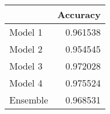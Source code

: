 \begin{tabular}{lr}
\toprule
{} &  Accuracy \\
\midrule
Model 1  &  0.961538 \\
Model 2  &  0.954545 \\
Model 3  &  0.972028 \\
Model 4  &  0.975524 \\
Ensemble &  0.968531 \\
\bottomrule
\end{tabular}
